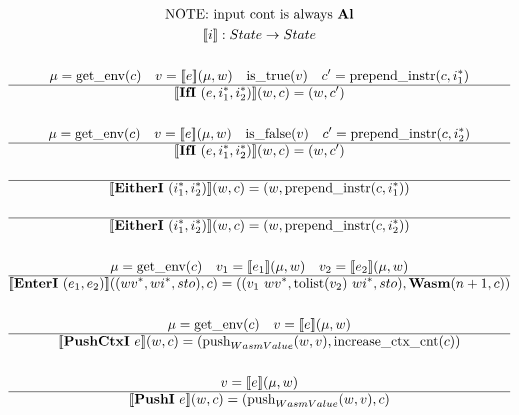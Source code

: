 
\newpage

\begin{gather*}
  \text{NOTE: input cont is always \al} \\
  \sem{i} : State \rightarrow State \\
%
\newline \\
  \mu = \getenv(c) \quad v = \sem{e}(\mu, w) \quad
  \istrue(v) \quad c' = \prependinstr(c, \seq{i_1}) \\
  \hline
  \sem{\ifi ~ (e, \seq{i_1}, \seq{i_2})}(w, c) = (w, c') \\
%
\newline \\
  \mu = \getenv(c) \quad v = \sem{e}(\mu, w) \quad
  \isfalse(v) \quad c' = \prependinstr(c, \seq{i_2}) \\
  \hline
  \sem{\ifi ~ (e, \seq{i_1}, \seq{i_2})}(w, c) = (w, c') \\
%
\newline \\
  \hline
  \sem{\eitheri ~ (\seq{i_1}, \seq{i_2})}(w, c) = (w, \prependinstr(c, \seq{i_1})) \\
%
\newline \\
  \hline
  \sem{\eitheri ~ (\seq{i_1}, \seq{i_2})}(w, c) = (w, \prependinstr(c, \seq{i_2})) \\
%
\newline \\
  \mu = \getenv(c) \quad v_1 = \sem{e_1}(\mu, w) \quad v_2 = \sem{e_2}(\mu, w) \\
  \hline
  \sem{\enteri ~ (e_1, e_2)}((\seq{wv}, \seq{wi}, sto), c)
  =
  ((v_1 ~ \seq{wv}, \tolist(v_2) ~ \seq{wi}, sto), \wasm (n+1, c)) \\
%
\newline \\
  \mu = \getenv(c) \quad v = \sem{e}(\mu, w) \\
  \hline
  \sem{\pushctxi ~ e}(w, c)
  =
  (\push_{WasmValue}(w, v), \increasectxcnt(c)) \\
%
\newline \\
  v = \sem{e}(\mu, w) \\
  \hline
  \sem{\pushi ~ e}(w, c) = (\push_{WasmValue}(w, v), c) \\
%
\newline \\

\end{gather*}

